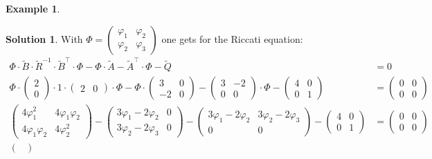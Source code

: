 \documentclass[a4paper,12 pt]{article}
\numberwithin{equation}{section}
\theoremstyle{definition}
\newtheorem{bsp}{Example}
\theoremstyle{remark}
\theoremstyle{definition}
\newtheorem*{lsg}{Solution}
\theoremstyle{definition}
\theoremstyle{definition}
\theoremstyle{remark}
\begin{document}
\begin{bsp}
\begin{lsg}
With $\Phi=\begin{pmatrix} \varphi_1 & \varphi_2 \\ \varphi_2 & \varphi_3 \end{pmatrix}$ one gets for the Riccati equation:
\begin{equation*}
\begin{split}
\Phi\cdot \tilde{B}\cdot \tilde{R}^{-1}\cdot \tilde{B}^\intercal\cdot \Phi-\Phi\cdot \tilde{A}-\tilde{A}^\intercal\cdot \Phi-\tilde{Q}&=0\\
\Phi \cdot \begin{pmatrix} 2\\ 0\end{pmatrix} \cdot 1 \cdot \begin{pmatrix} 2& 0\end{pmatrix}\cdot \Phi - \Phi \cdot \begin{pmatrix} 3&0\\-2&0\end{pmatrix} -\begin{pmatrix} 3&-2\\ 0&0\end{pmatrix}\cdot \Phi - \begin{pmatrix} 4&0\\ 0&1 \end{pmatrix}&=\begin{pmatrix} 0&0 \\ 0&0 \end{pmatrix}\\
\begin{pmatrix} 4\varphi_1^2 & 4\varphi_1 \varphi_2 \\ 4\varphi_1 \varphi_2 & 4\varphi_2^2 \end{pmatrix} - \begin{pmatrix} 3\varphi_1-2\varphi_2 &0 \\ 3\varphi_2-2\varphi_3 &0 \end{pmatrix} -\begin{pmatrix} 3\varphi_1-2\varphi_2 & 3\varphi_2-2\varphi_3\\ 0 &0 \end{pmatrix}-\begin{pmatrix} 4&0\\ 0&1 \end{pmatrix}&=\begin{pmatrix} 0&0 \\ 0&0 \end{pmatrix}\\
\begin{pmatrix} 

\end{pmatrix}
\end{split}
\end{equation*}
\end{lsg}
\end{bsp}
\end{document}
